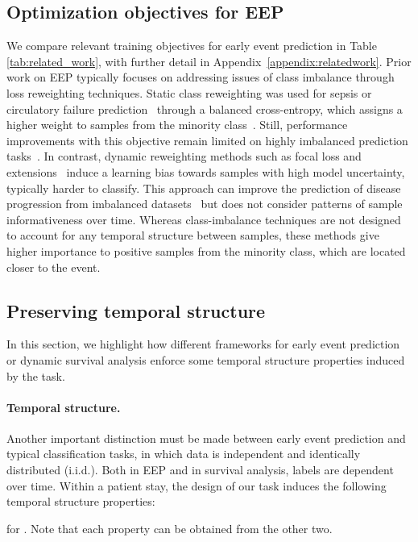 \documentclass[nohyperref]{article}
\begin{document}
\subsection{Optimization objectives for EEP} 

We compare relevant training objectives for early event prediction in Table \ref{tab:related_work}, with further detail in Appendix~\ref{appendix:relatedwork}. Prior work on EEP typically focuses on addressing issues of class imbalance through loss reweighting techniques. Static class reweighting was used for sepsis or circulatory failure prediction~\citep{futoma2017learning,hyland2020} through a balanced cross-entropy, which assigns a higher weight to samples from the minority class~\citep{king2001logistic}. Still, performance improvements with this objective remain limited on highly imbalanced prediction tasks~\citep{yeche2021}. In contrast, dynamic reweighting methods such as focal loss and extensions~\citep{lin2017, polyloss} induce a learning bias towards samples with high model uncertainty, typically harder to classify. This approach can improve the prediction of disease progression from imbalanced datasets~\citep{wang2020feature,roy2022disability} but does not consider patterns of sample informativeness over time. Whereas class-imbalance techniques are not designed to account for any temporal structure between samples, these methods give higher importance to positive samples from the minority class, which are located closer to the event.

\subsection{Preserving temporal structure}
\label{sec:temp_structure}
In this section, we highlight how different frameworks for early event prediction or dynamic survival analysis enforce some temporal structure properties induced by the task.

\paragraph{Temporal structure.} Another important distinction must be made between early event prediction and typical classification tasks, in which data is independent and identically distributed (i.i.d.). Both in EEP and in survival analysis, labels are dependent over time. Within a patient stay, the design of our task induces the following temporal structure properties:
 
for . Note that each property can be obtained from the other two.
\end{document}
